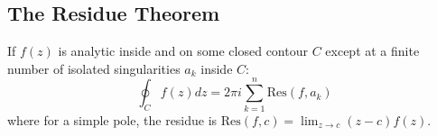 \documentclass{article}
\begin{document}
\subsection{The Residue Theorem}
If $f(z)$ is analytic inside and on some closed contour $C$ except at a finite number of isolated singularities $a_k$ inside $C$:
\begin{equation}
    \oint_C f(z) dz = 2\pi i \sum_{k=1}^n \text{Res}(f, a_k)
\end{equation}
where for a simple pole, the residue is $\text{Res}(f, c) = \lim_{z \to c} (z-c)f(z)$.
\end{document}
